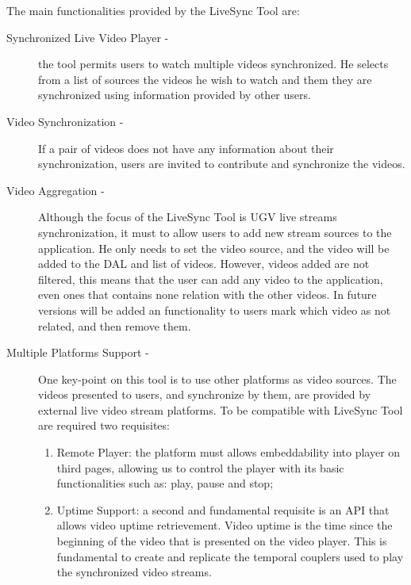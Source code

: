 The main functionalities provided by the LiveSync Tool are:

\begin{description}
	\item[Synchronized Live Video Player -]	the tool permits users to watch multiple videos synchronized. He selects from a list of sources the videos he wish to watch and them they are synchronized using information provided by other users.
	
	\item[Video Synchronization -] If a pair of videos does not have any information about their synchronization, users are invited to contribute and synchronize the videos.
	
		
	\item[Video Aggregation -]	Although the focus of the LiveSync Tool is UGV live streams synchronization, it must to allow users to add new stream sources to the application. He only needs to set the video source, and the video will be added to the DAL and list of videos. However, videos added are not filtered, this means that the user can add any video to the application, even ones that contains none relation with the other videos. In future versions will be added an functionality to users mark which video as not related, and then remove them.
	
	\item[Multiple Platforms Support -] One key-point on this tool is to use other platforms as video sources. The videos presented to users, and synchronize by them, are provided by external live video stream platforms. To be compatible with LiveSync Tool are required two requisites:
	\begin{enumerate}
		\item Remote Player: the platform must allows embeddability into player on third pages, allowing us to control the player with its basic functionalities such as: play, pause and stop;
		\item Uptime Support: a second and fundamental requisite is an API that allows video uptime retrievement. Video uptime is the time since the beginning of the video that is presented on the video player. This is fundamental to create and replicate the temporal couplers used to play the synchronized video streams.
	\end{enumerate}
	

\end{description}

